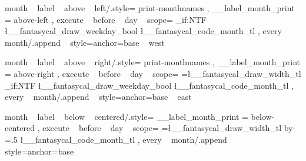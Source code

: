 \tikzset
  {
    month ~ label ~ above ~ left/.style=
      {
        print-monthnames ,
        __label_month_print = { above-left } ,
        execute ~ before ~ day ~ scope=
          {
              {
                {
                  \bool_if:NTF \l__fantasycal_draw_weekday_bool
                    {  }
                    {  }
                  \l__fantasycal_code_month_tl%
                }
              } 
          }
        ,
        every ~ month/.append ~ style={anchor=base ~ west}
      }
  }



\tikzset
  {
    month ~ label ~ above ~ right/.style=
      {
        print-monthnames ,
        __label_month_print = { above-right } ,
        execute ~ before ~ day ~ scope=
          {
              {
                {
                  \pgf@xb=\l__fantasycal_draw_width_tl\pgf@xa%
                  \pgftransformxshift{\pgf@xb}
                  \bool_if:NTF \l__fantasycal_draw_weekday_bool
                    {  }
                    {  }
                  \l__fantasycal_code_month_tl%
                }
              } 
          }
        ,
        every ~ month/.append ~ style={anchor=base ~ east}
      }
  }

\tikzset
  {
    month ~ label ~ below ~ centered/.style=
      {
        __label_month_print = { below-centered } ,
        execute ~ before ~ day ~ scope=
          {
              {
                {
                  \pgf@xb=\l__fantasycal_draw_width_tl\pgf@xa%
                  \advance\pgf@xb by-\pgf@xa%
                  \pgf@xb=.5\pgf@xb%
                  \pgftransformxshift{\pgf@xb}
                  \pgftransformxshift{-1.5ex}
                  \l__fantasycal_code_month_tl%
                }
              } 
          }
        ,
        every ~ month/.append ~ style={anchor=base}
      }
  }

